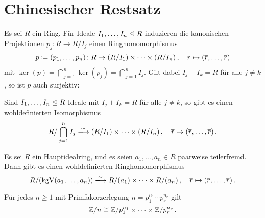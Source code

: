 \section{Chinesischer Restsatz}

Es sei $R$ ein Ring.
Für Ideale $I_1, \dotsc, I_n \mathrel{\trianglelefteq} R$ induzieren die kanonischen Projektionen $p_j \colon R \to R/I_j$ einen Ringhomomorphismus
\[
            p
  \coloneqq  (p_1, \dotsc, p_n)
  \colon    R
  \to       (R/I_1) \times \dotsb \times (R/I_n) \,,
  \quad     r
  \mapsto   (\overline{r}, \dotsc, \overline{r})
\]
mit $\ker(p) = \bigcap_{j=1}^n \ker(p_j) = \bigcap_{j=1}^n I_j$.
Gilt dabei $I_j + I_k = R$ für alle $j \neq k$, so ist $p$ auch surjektiv:

\begin{theorem}
  Sind $I_1, \dotsc, I_n \mathrel{\trianglelefteq} R$ Ideale mit $I_j + I_k = R$ für alle $j \neq k$, so gibt es einen wohldefinierten Isomorphismus
  \[
                            R / \bigcap_{j=1}^n I_j
    \xlongrightarrow{\sim}  (R/I_1) \times \dotsb \times (R/I_n) \,,
    \quad                   \class{r}
    \mapsto                 (\class{r}, \dotsc, \class{r}) \,.
  \]
\end{theorem}

\begin{corollary}
  Es sei $R$ ein Hauptidealring, und es seien $a_1, \dotsc, a_n \in R$ paarweise teilerfremd.
  Dann gibt es einen wohldefinierten Ringhomomorphismus
  \[
                            R/\genideal{\kgV(a_1, \dotsc, a_n)}
    \xlongrightarrow{\sim}  R/\genideal{a_1} \times \dotsb \times R/\genideal{a_n} \,,
    \quad                   \class{r}
    \mapsto                 ( \class{r}, \dotsc, \class{r} ) \,.
  \]
\end{corollary}

\begin{corollary}
  Für jedes $n \geq 1$ mit Primfakorzerlegung $n = p_1^{n_1} \dotsm p_r^{n_r}$ gilt
  \[
          \mathbb{Z}/n
    \cong \mathbb{Z}/p_1^{n_1} \times \dotsb \times \mathbb{Z}/p_r^{n_r} \,.
  \]
\end{corollary}















